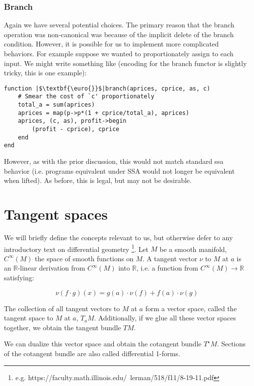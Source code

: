 \documentclass[letterpaper, 10 pt, conference]{ieeeconf}  %
\begin{document}
\subsubsection{Branch}

Again we have several potential choices. The primary reason that the branch
operation was non-canonical was because of the implicit delete of the branch
condition. However, it is possible for us to implement more complicated
behaviors. For example suppose we wanted to proportionately assign to each
input. We might write something like (encoding for the branch functor is
slightly tricky, this is one example):

\begin{verbatim}
function |$\textbf{\euro{}}$|branch(aprices, cprice, as, c)
    # Smear the cost of `c' proportionately
    total_a = sum(aprices)
    aprices = map(p->p*(1 + cprice/total_a), aprices)
    aprices, (c, as), profit->begin
        (profit - cprice), cprice
    end
end
\end{verbatim}

However, as with the prior discussion, this would not match standard ssa behavior
(i.e. programs equivalent under SSA would not longer be equivalent when lifted).
As before, this is legal, but may not be desirable.

\section{Tangent spaces}

We will briefly define the concepts relevant to us, but otherwise defer to any
introductory text on differential geometry \footnote{e.g. https://faculty.math.illinois.edu/~lerman/518/f11/8-19-11.pdf}. Let $M$ be a smooth manifold,
$C^\infty(M)$ the space of smooth functions on $M$. A tangent vector $\nu$ to $M$
at $a$ is an $\mathbb{R}$-linear derivation from $C^\infty(M)$ into $\mathbb{R}$,
i.e. a function from $C^\infty(M) \to \mathbb{R}$ satisfying:

\[
\nu(f \cdot g)(x) = g(a)\cdot \nu(f) + f(a) \cdot \nu(g)
\]

The collection of all tangent vectors to $M$ at $a$ form a vector space, called
the tangent space to $M$ at $a$, $T_a M$. Additionally, if we glue all these
vector spaces together, we obtain the tangent bundle $T M$.

We can dualize this vector space and obtain the cotangent bundle $T^\star M$.
Sections of the cotangent bundle are also called differential 1-forms.
\end{document}
